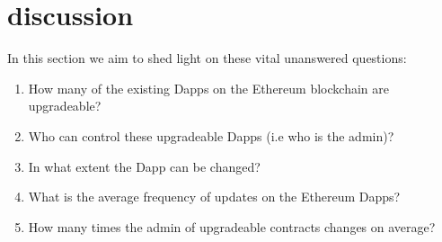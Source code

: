 








\section{discussion}

In this section we aim to shed light on these vital unanswered questions: 
 \begin{enumerate}
  \item How many of the existing Dapps on the Ethereum blockchain are upgradeable?
  \item Who can control these upgradeable Dapps (i.e who is the admin)? 
  \item In what extent the Dapp can be changed?
  \item What is the average frequency of updates on the Ethereum Dapps?
  \item How many times the admin of upgradeable contracts changes on average?
\end{enumerate}

